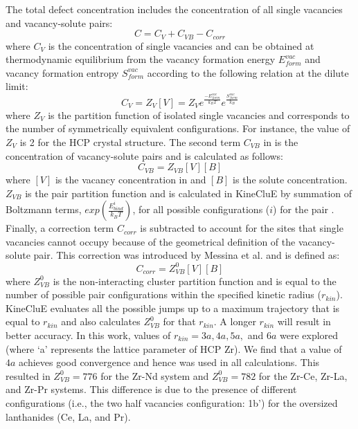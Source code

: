 \documentclass[preprint,12pt]{elsarticle}
\begin{document}
The total defect concentration includes the concentration of all single vacancies and vacancy-solute pairs:
\begin{equation}
\label{eq_tot_conc}
    C = C_V + C_{VB} - C_{corr}
\end{equation}
where $C_V$ is the concentration of single vacancies and can be obtained at thermodynamic equilibrium from the vacancy formation energy $E_{form}^{vac}$ and vacancy formation entropy $S_{form}^{vac}$ according to the following relation at the dilute limit:
\begin{equation}
\label{eq_vac_conc}
    C_V = Z_V [V] = Z_V e^{\frac{-E_{form}^{vac}}{k_B T}} e^{\frac{S_{form}^{vac}}{k_B}}
\end{equation}
where $Z_V$ is the partition function of isolated single vacancies and corresponds to the number of symmetrically equivalent configurations. For instance, the value of $Z_V$ is 2 for the HCP crystal structure. The second term $C_{VB}$ in  is the concentration of vacancy-solute pairs and is calculated as follows:
\begin{equation}
    C_{VB} = Z_{VB} [V] [B]
\end{equation}
where $[V]$ is the vacancy concentration in  and $[B]$ is the solute concentration. $Z_{VB}$ is the pair partition function and is calculated in KineCluE by summation of Boltzmann terms, $exp(\frac{E_{bind}^i}{k_B T})$, for all possible configurations ($i$) for the pair \cite{schuler_kineclue_2020}. Finally, a correction term $C_{corr}$ is subtracted to account for the sites that single vacancies cannot occupy because of the geometrical definition of the vacancy-solute pair. This correction was introduced by Messina et al. \cite{messina_solute_2020} and is defined as:
\begin{equation}
\label{eq_corr_conc}
    C_{corr} = Z_{VB}^0 [V] [B]
\end{equation}
where $Z_{VB}^0$ is the non-interacting cluster partition function and is equal to the number of possible pair configurations within the specified kinetic radius ($r_{kin}$). KineCluE evaluates all the possible jumps up to a maximum trajectory that is equal to $r_{kin}$ and also calculates $Z_{VB}^0$ for that $r_{kin}$. A longer $r_{kin}$ will result in better accuracy. In this work, values of $r_{kin} = 3a, 4a, 5a,$ and $6a$ were explored (where `a' represents the lattice parameter of HCP Zr). We find that a value of $4a$ achieves good convergence and hence was used in all calculations. This resulted in $Z_{VB}^0 = 776$ for the Zr-Nd system and $Z_{VB}^0 = 782$ for the Zr-Ce, Zr-La, and Zr-Pr systems. This difference is due to the presence of different configurations (i.e., the two half vacancies configuration: 1b') for the oversized lanthanides (Ce, La, and Pr). 
\end{document}
